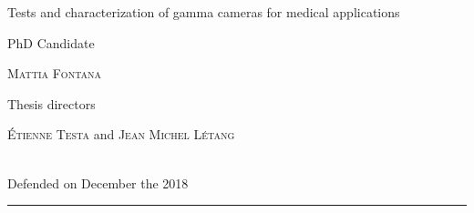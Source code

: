 \begin{titlepage}

\noindent
\textcolor{titlepagecolor}{\titlefont Tests and characterization \newline of gamma
cameras for \newline medical applications}\par
\epigraph{PhD Candidate}%
{\textsc{Mattia Fontana}}

\epigraph{Thesis directors}%
{\textsc{\'{E}tienne Testa} and \textsc{Jean Michel L\'{e}tang}}
\null\vfill
\vspace*{1cm}
\noindent
\hfill
\begin{minipage}{0.35\linewidth}
    \begin{flushright}
        \printuniv \\
        Defended on December the  2018
    \end{flushright}
\end{minipage}
%
\begin{minipage}{0.02\linewidth}
    \rule{1pt}{125pt}
\end{minipage}
\titlepagedecoration
\end{titlepage}

